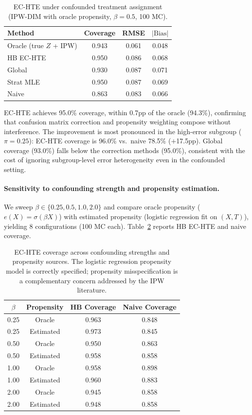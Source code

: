 \begin{table}[h]
\centering
\caption{EC-HTE under confounded treatment assignment (IPW-DIM with oracle propensity, $\beta{=}0.5$, 100 MC).}
\label{tab:confounded_dgp}
\small
\begin{tabular}{lccc}
\toprule
Method & Coverage & RMSE & $|\text{Bias}|$ \\
\midrule
Oracle (true $Z$ + IPW) & 0.943 & 0.061 & 0.048 \\
HB EC-HTE              & 0.950 & 0.086 & 0.068 \\
Global                  & 0.930 & 0.087 & 0.071 \\
Strat MLE               & 0.950 & 0.087 & 0.069 \\
Naive                   & 0.863 & 0.083 & 0.066 \\
\bottomrule
\end{tabular}
\end{table}

EC-HTE achieves 95.0\% coverage, within 0.7pp of the oracle (94.3\%), confirming that confusion matrix correction and propensity weighting compose without interference.
The improvement is most pronounced in the high-error subgroup ($\pi{=}0.25$): EC-HTE coverage is 96.0\% vs.\ naive 78.5\% ($+$17.5pp).
Global coverage (93.0\%) falls below the correction methods (95.0\%), consistent with the cost of ignoring subgroup-level error heterogeneity even in the confounded setting.

\paragraph{Sensitivity to confounding strength and propensity estimation.}
We sweep $\beta \in \{0.25, 0.5, 1.0, 2.0\}$ and compare oracle propensity ($e(X) = \sigma(\beta X)$) with estimated propensity (logistic regression fit on $(X, T)$), yielding 8 configurations (100 MC each).
Table~\ref{tab:confounded_sweep} reports HB EC-HTE and naive coverage.

\begin{table}[h]
\centering
\caption{EC-HTE coverage across confounding strengths and propensity sources. The logistic regression propensity model is correctly specified; propensity misspecification is a complementary concern addressed by the IPW literature.}
\label{tab:confounded_sweep}
\small
\begin{tabular}{cccc}
\toprule
$\beta$ & Propensity & HB Coverage & Naive Coverage \\
\midrule
0.25 & Oracle    & 0.963 & 0.848 \\
0.25 & Estimated & 0.973 & 0.845 \\
0.50 & Oracle    & 0.950 & 0.863 \\
0.50 & Estimated & 0.958 & 0.858 \\
1.00 & Oracle    & 0.958 & 0.898 \\
1.00 & Estimated & 0.960 & 0.883 \\
2.00 & Oracle    & 0.945 & 0.858 \\
2.00 & Estimated & 0.948 & 0.858 \\
\bottomrule
\end{tabular}
\end{table}

